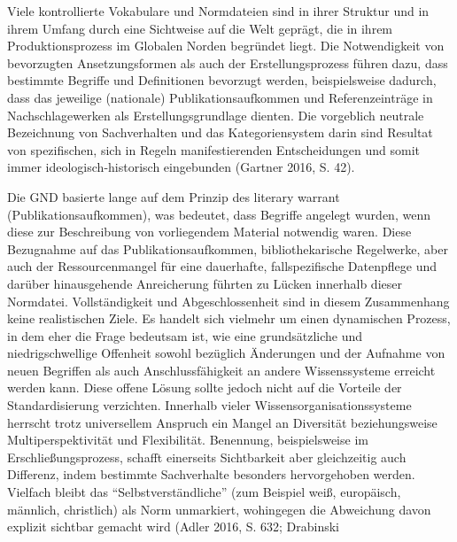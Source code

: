 \documentclass[a4paper,
fontsize=11pt,
oneside,
numbers=noperiodatend,
parskip=half-,
bibliography=totoc,
final
]{scrartcl}
\begin{document}
Viele kontrollierte Vokabulare und Normdateien sind in ihrer Struktur
und in ihrem Umfang durch eine Sichtweise auf die Welt geprägt, die in
ihrem Produktionsprozess im Globalen Norden begründet liegt. Die
Notwendigkeit von bevorzugten Ansetzungsformen als auch der
Erstellungsprozess führen dazu, dass bestimmte Begriffe und Definitionen
bevorzugt werden, beispielsweise dadurch, dass das jeweilige (nationale)
Publikationsaufkommen und Referenzeinträge in Nachschlagewerken als
Erstellungsgrundlage dienten. Die vorgeblich neutrale Bezeichnung von
Sachverhalten und das Kategoriensystem darin sind Resultat von
spezifischen, sich in Regeln manifestierenden Entscheidungen und somit
immer ideologisch-historisch eingebunden (Gartner 2016, S. 42).

Die GND basierte lange auf dem Prinzip des literary warrant
(Publikationsaufkommen), was bedeutet, dass Begriffe angelegt wurden,
wenn diese zur Beschreibung von vorliegendem Material notwendig waren.
Diese Bezugnahme auf das Publikationsaufkommen, bibliothekarische
Regelwerke, aber auch der Ressourcenmangel für eine dauerhafte,
fallspezifische Datenpflege und darüber hinausgehende Anreicherung
führten zu Lücken innerhalb dieser Normdatei. Vollständigkeit und
Abgeschlossenheit sind in diesem Zusammenhang keine realistischen Ziele.
Es handelt sich vielmehr um einen dynamischen Prozess, in dem eher die
Frage bedeutsam ist, wie eine grundsätzliche und niedrigschwellige
Offenheit sowohl bezüglich Änderungen und der Aufnahme von neuen
Begriffen als auch Anschlussfähigkeit an andere Wissenssysteme erreicht
werden kann. Diese offene Lösung sollte jedoch nicht auf die Vorteile
der Standardisierung verzichten. Innerhalb vieler
Wissensorganisationssysteme herrscht trotz universellem Anspruch ein
Mangel an Diversität beziehungsweise Multiperspektivität und
Flexibilität. Benennung, beispielsweise im Erschließungsprozess, schafft
einerseits Sichtbarkeit aber gleichzeitig auch Differenz, indem
bestimmte Sachverhalte besonders hervorgehoben werden. Vielfach bleibt
das \enquote{Selbstverständliche} (zum Beispiel weiß, europäisch,
männlich, christlich) als Norm unmarkiert, wohingegen die Abweichung
davon explizit sichtbar gemacht wird (Adler 2016, S. 632; Drabinski
\end{document}
